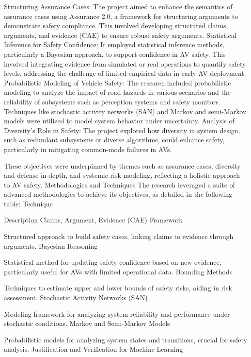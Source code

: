     Structuring Assurance Cases: The project aimed to enhance the semantics of assurance cases using Assurance 2.0, a framework for structuring arguments to demonstrate safety compliance. This involved developing structured claims, arguments, and evidence (CAE) to ensure robust safety arguments.
    Statistical Inference for Safety Confidence: It employed statistical inference methods, particularly a Bayesian approach, to support confidence in AV safety. This involved integrating evidence from simulated or real operations to quantify safety levels, addressing the challenge of limited empirical data in early AV deployment.
    Probabilistic Modeling of Vehicle Safety: The research included probabilistic modeling to analyze the impact of road hazards in various scenarios and the reliability of subsystems such as perception systems and safety monitors. Techniques like stochastic activity networks (SAN) and Markov and semi-Markov models were utilized to model system behavior under uncertainty.
    Analysis of Diversity's Role in Safety: The project explored how diversity in system design, such as redundant subsystems or diverse algorithms, could enhance safety, particularly in mitigating common-mode failures in AVs.

These objectives were underpinned by themes such as assurance cases, diversity and defense-in-depth, and systemic risk modeling, reflecting a holistic approach to AV safety.
Methodologies and Techniques
The research leveraged a suite of advanced methodologies to achieve its objectives, as detailed in the following table:
Technique
	
Description
Claims, Argument, Evidence (CAE) Framework
	
Structured approach to build safety cases, linking claims to evidence through arguments.
Bayesian Reasoning
	
Statistical method for updating safety confidence based on new evidence, particularly useful for AVs with limited operational data.
Bounding Methods
	
Techniques to estimate upper and lower bounds of safety risks, aiding in risk assessment.
Stochastic Activity Networks (SAN)
	
Modeling framework for analyzing system reliability and performance under stochastic conditions.
Markov and Semi-Markov Models
	
Probabilistic models for analyzing system states and transitions, crucial for safety analysis.
Justification and Verification for Machine Learning
	
